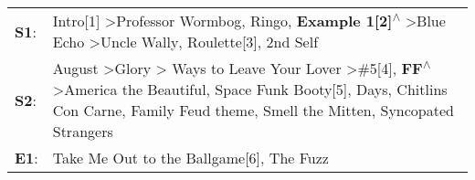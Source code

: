 \begin{supertabular}{p{0.03\textwidth}p{0.92\textwidth}}
 \textbf{S1}:  &                                                                                                                                                                                                                     Intro[1]\textsuperscript{} \textgreater \enspace Professor Wormbog\textsuperscript{}, \enspace Ringo\textsuperscript{}, \enspace \textbf{Example 1[2]\textsuperscript{$\wedge$}} \textgreater \enspace Blue Echo\textsuperscript{} \textgreater \enspace Uncle Wally\textsuperscript{}, \enspace Roulette[3]\textsuperscript{}, \enspace 2nd Self\textsuperscript{}  \enspace  \\
 \textbf{S2}:  &  August\textsuperscript{} \textgreater \enspace Glory\textsuperscript{} \textgreater {} Ways to Leave Your Lover\textsuperscript{} \textgreater \enspace \#5[4]\textsuperscript{}, \enspace \textbf{FF\textsuperscript{$\wedge$}} \textgreater \enspace America the Beautiful\textsuperscript{}, \enspace Space Funk Booty[5]\textsuperscript{},  Days\textsuperscript{}, \enspace Chitlins Con Carne\textsuperscript{}, \enspace Family Feud theme\textsuperscript{}, \enspace Smell the Mitten\textsuperscript{}, \enspace Syncopated Strangers\textsuperscript{}  \enspace  \\
 \textbf{E1}:  &                                                                                                                                                                                                                                                                                                                                                                                                                                                                                                   Take Me Out to the Ballgame[6]\textsuperscript{}, \enspace The Fuzz\textsuperscript{}  \enspace  \\
\end{supertabular}
